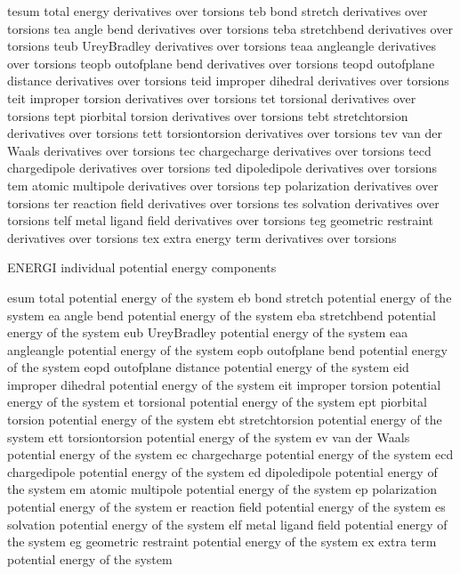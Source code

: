 \documentclass[letterpaper,11pt,english]{sphinxmanual}
\begin{document}
tesum   total energy derivatives over torsions
teb     bond stretch derivatives over torsions
tea     angle bend derivatives over torsions
teba    stretch\sphinxhyphen{}bend derivatives over torsions
teub    Urey\sphinxhyphen{}Bradley derivatives over torsions
teaa    angle\sphinxhyphen{}angle derivatives over torsions
teopb   out\sphinxhyphen{}of\sphinxhyphen{}plane bend derivatives over torsions
teopd   out\sphinxhyphen{}of\sphinxhyphen{}plane distance derivatives over torsions
teid    improper dihedral derivatives over torsions
teit    improper torsion derivatives over torsions
tet     torsional derivatives over torsions
tept    pi\sphinxhyphen{}orbital torsion derivatives over torsions
tebt    stretch\sphinxhyphen{}torsion derivatives over torsions
tett    torsion\sphinxhyphen{}torsion derivatives over torsions
tev     van der Waals derivatives over torsions
tec     charge\sphinxhyphen{}charge derivatives over torsions
tecd    charge\sphinxhyphen{}dipole derivatives over torsions
ted     dipole\sphinxhyphen{}dipole derivatives over torsions
tem     atomic multipole derivatives over torsions
tep     polarization derivatives over torsions
ter     reaction field derivatives over torsions
tes     solvation derivatives over torsions
telf    metal ligand field derivatives over torsions
teg     geometric restraint derivatives over torsions
tex     extra energy term derivatives over torsions

ENERGI  individual potential energy components

esum    total potential energy of the system
eb      bond stretch potential energy of the system
ea      angle bend potential energy of the system
eba     stretch\sphinxhyphen{}bend potential energy of the system
eub     Urey\sphinxhyphen{}Bradley potential energy of the system
eaa     angle\sphinxhyphen{}angle potential energy of the system
eopb    out\sphinxhyphen{}of\sphinxhyphen{}plane bend potential energy of the system
eopd    out\sphinxhyphen{}of\sphinxhyphen{}plane distance potential energy of the system
eid     improper dihedral potential energy of the system
eit     improper torsion potential energy of the system
et      torsional potential energy of the system
ept     pi\sphinxhyphen{}orbital torsion potential energy of the system
ebt     stretch\sphinxhyphen{}torsion potential energy of the system
ett     torsion\sphinxhyphen{}torsion potential energy of the system
ev      van der Waals potential energy of the system
ec      charge\sphinxhyphen{}charge potential energy of the system
ecd     charge\sphinxhyphen{}dipole potential energy of the system
ed      dipole\sphinxhyphen{}dipole potential energy of the system
em      atomic multipole potential energy of the system
ep      polarization potential energy of the system
er      reaction field potential energy of the system
es      solvation potential energy of the system
elf     metal ligand field potential energy of the system
eg      geometric restraint potential energy of the system
ex      extra term potential energy of the system
\end{document}
